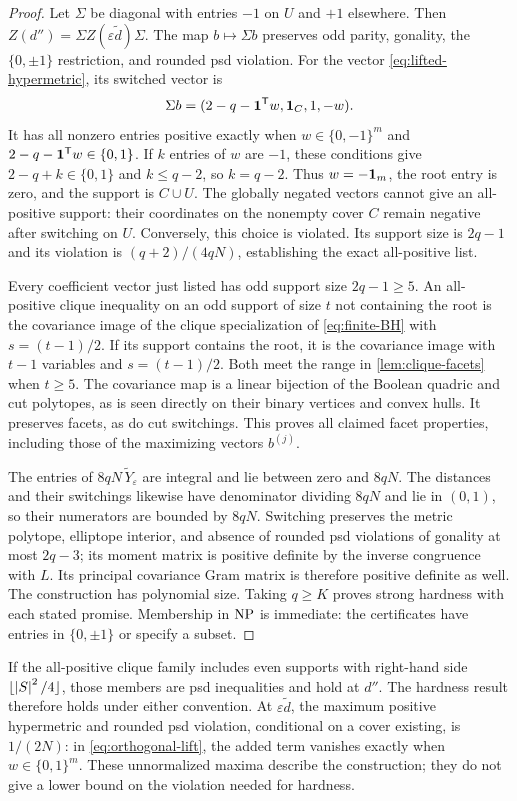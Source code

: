 \begin{proof}
Let $\Sigma$ be diagonal with entries $-1$ on $U$ and $+1$ elsewhere.
Then $Z(d'')=\Sigma Z(\varepsilon\widetilde d)\Sigma$.
The map $b\mapsto\Sigma b$ preserves odd parity, gonality, the
$\{0,\pm1\}$ restriction, and rounded psd violation.
For the vector \eqref{eq:lifted-hypermetric}, its switched vector is
\[
 \Sigma b=(2-q-\mathbf 1^{\mathsf T} w,\mathbf 1_C,1,-w).
\]
It has all nonzero entries positive exactly when
$w\in\{0,-1\}^m$ and $2-q-\mathbf 1^{\mathsf T} w\in\{0,1\}$.
If $k$ entries of $w$ are $-1$, these conditions give
$2-q+k\in\{0,1\}$ and $k\leq q-2$, so $k=q-2$.
Thus $w=-\mathbf 1_m$, the root entry is zero, and the support is $C\cup U$.
The globally negated vectors cannot give an all-positive support:
their coordinates on the nonempty cover $C$ remain negative after
switching on $U$.
Conversely, this choice is violated. Its support size is $2q-1$ and its
violation is $(q+2)/(4qN)$, establishing the exact all-positive list.

Every coefficient vector just listed has odd support size $2q-1\geq5$.
An all-positive clique inequality on an odd support of size $t$ not
containing the root is the covariance image of
the clique specialization of \eqref{eq:finite-BH} with $s=(t-1)/2$.
If its support contains the root, it is the covariance image with
$t-1$ variables and $s=(t-1)/2$.
Both meet the range in \cref{lem:clique-facets} when $t\geq5$.
The covariance map is a linear bijection of the Boolean quadric and
cut polytopes, as is seen directly on their binary vertices and convex
hulls. It preserves facets, as do cut switchings.
This proves all claimed facet properties, including those of the
maximizing vectors $b^{(j)}$.

The entries of $8qN\,\widetilde Y_\varepsilon$ are integral and lie
between zero and $8qN$. The distances and their switchings likewise
have denominator dividing $8qN$ and lie in $(0,1)$, so their numerators
are bounded by $8qN$. Switching preserves the metric polytope,
elliptope interior, and absence of rounded psd violations of gonality
at most $2q-3$; its moment matrix is positive definite by the inverse
congruence with $L$. Its principal covariance Gram matrix is therefore
positive definite as well.
The construction has polynomial size. Taking $q\geq K$ proves strong
hardness with each stated promise. Membership in $\mathrm{NP}$ is immediate:
the certificates have entries in $\{0,\pm1\}$ or specify a subset.
\end{proof}

\begin{remark}
If the all-positive clique family includes even supports with right-hand
side $\lfloor\left\lvert S\right\rvert^2/4\rfloor$, those members are psd inequalities and
hold at $d''$. The hardness result therefore holds under either convention.
At $\varepsilon\widetilde d$, the maximum positive hypermetric and
rounded psd violation, conditional on a cover existing, is $1/(2N)$:
in \eqref{eq:orthogonal-lift}, the added term vanishes exactly when
$w\in\{0,1\}^m$. These unnormalized maxima describe the construction;
they do not give a lower bound on the violation needed for hardness.
\end{remark}
